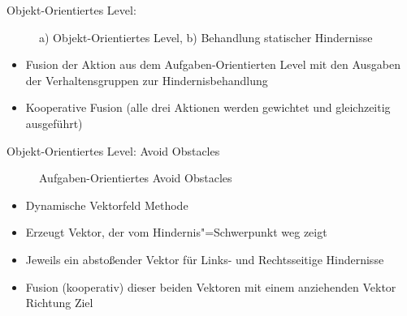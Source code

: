 Objekt-Orientiertes Level:
\begin{figure}
	\centering
	\caption{a) Objekt-Orientiertes Level, b) Behandlung statischer Hindernisse}
	\label{ch:08:fig:objekt-orientiert}
\end{figure}
\begin{itemize}
	\item Fusion der Aktion aus dem Aufgaben-Orientierten Level mit den Ausgaben der Verhaltensgruppen zur Hindernisbehandlung
	\item Kooperative Fusion (alle drei Aktionen werden gewichtet und gleichzeitig ausgeführt)
\end{itemize}
Objekt-Orientiertes Level: Avoid Obstacles
\begin{figure}
	\centering
	\caption{Aufgaben-Orientiertes Avoid Obstacles}
	\label{ch:08:fig:objekt-orientiert-hindernis}
\end{figure}
\begin{itemize}
	\item Dynamische Vektorfeld Methode
	\item Erzeugt Vektor, der vom Hindernis"=Schwerpunkt weg zeigt
	\item Jeweils ein abstoßender Vektor für Links- und Rechtsseitige Hindernisse
	\item Fusion (kooperativ) dieser beiden Vektoren mit einem anziehenden Vektor Richtung Ziel
\end{itemize}

